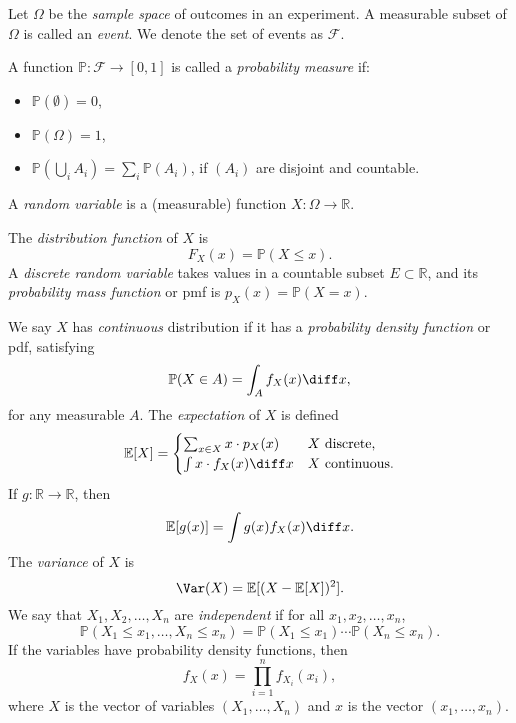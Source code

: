 \documentclass[12pt]{article}
\begin{document}
Let $\Omega$ be the \emph{sample space} of outcomes in an experiment. A measurable subset of $\Omega$ is called an \emph{event}. We denote the set of events as $\mathcal{F}$.

A function $\mathbb{P} : \mathcal{F} \to [0, 1]$ is called a \emph{probability measure} if:
\begin{itemize}
	\item $\mathbb{P}(\emptyset) = 0$,
	\item $\mathbb{P}(\Omega) = 1$,
	\item $\mathbb{P}(\bigcup_{i} A_i) = \sum_{i} \mathbb{P}(A_i)$, if $(A_i)$ are disjoint and countable.
\end{itemize}

A \emph{random variable} is a (measurable) function $X : \Omega \to \mathbb{R}$.

The \emph{distribution function} of $X$ is
\[
F_X(x) = \mathbb{P}(X \leq x)
.\]
A \emph{discrete random variable} takes values in a countable subset $E \subset \mathbb{R}$, and its \emph{probability mass function} or pmf is $p_X(x) = \mathbb{P}(X = x)$.

We say $X$ has \emph{continuous} distribution if it has a \emph{probability density function} or pdf, satisfying
\[
\mathbb{P}(X \in A) = \int_{A}f_X(x) \diff x
,\]
for any measurable $A$. The \emph{expectation} of $X$ is defined
\[
\mathbb{E}[X] =
\begin{cases}
	\sum_{x \in X}x \cdot p_X(x) & X \text{ discrete}, \\
	\int x \cdot f_X(x) \diff x & X \text{ continuous}.
\end{cases}
\]
If $g : \mathbb{R} \to \mathbb{R}$, then
\[
\mathbb{E}[g(x)] = \int g(x) f_X(x) \diff x
.\]
The \emph{variance} of $X$ is
\[
\Var(X) = \mathbb{E}[(X - \mathbb{E}[X])^2]
.\]
We say that $X_1, X_2, \ldots, X_n$ are \emph{independent} if for all $x_1, x_2, \ldots, x_n$,
 \[
\mathbb{P}(X_1 \leq x_1, \ldots, X_n \leq x_n) = \mathbb{P}(X_1 \leq x_1) \cdots \mathbb{P}(X_n \leq x_n)
.\]
If the variables have probability density functions, then
\[
f_X(x) = \prod_{i = 1}^{n}f_{X_i}(x_i)
,\]
where $X$ is the vector of variables $(X_1, \ldots, X_n)$ and $x$ is the vector $(x_1, \ldots, x_n)$.
\end{document}
